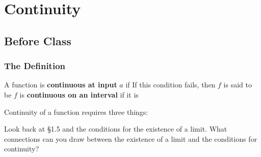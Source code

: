 \documentclass[notes]{subfiles}
\begin{document}
	\setcounter{section}{8}
	\fancyhead[LO,RE]{\bfseries \currentname}
	\fancyfoot[C]{{}}
	\fancyfoot[RO,LE]{\large \thepage}	%

\section*{Continuity}\label{cs18}
	\subsection*{Before Class}
	\subsubsection*{The Definition}
		\begin{defn}[Continuity]
			A function is \textbf{continuous at input} $a$ if 
			 If this condition fails, then $f$ is said to be 
			$f$ is \textbf{continuous on an interval} if it is
		\end{defn}
			
		\begin{rmk}
			Continuity of a function requires three things:
		\end{rmk}
		\begin{question}
			Look back at \S1.5 and the conditions for the existence of a limit.  What connections can you draw between the existence of a limit and the conditions for continuity?
		\end{question}	
			\newpage
			
\end{document}
